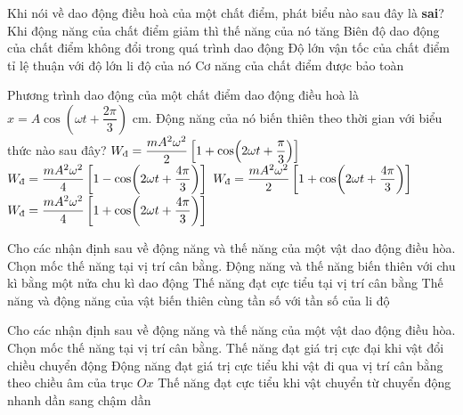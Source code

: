 \begin{ex}%
Khi nói về dao động điều hoà của một chất điểm, phát biểu nào sau đây là \textbf{sai}?
\choice
{Khi động năng của chất điểm giảm thì thế năng của nó tăng}
{Biên độ dao động của chất điểm không đổi trong quá trình dao động}
{\True Độ lớn vận tốc của chất điểm tỉ lệ thuận với độ lớn li độ của nó}
{Cơ năng của chất điểm được bảo toàn}
\end{ex} 
\begin{ex}
Phương trình dao động của một chất điểm dao động điều hoà là $x=A\cos(\omega t+\dfrac{2\pi}{3})$ cm. Động năng của nó biến thiên theo thời gian với biểu thức nào sau đây?
\choice
{$W_{\text{đ}}=\dfrac{mA^2\omega^2}{2}\left[1+\cos(2\omega t+\dfrac{\pi}{3})\right]$}
{$W_{\text{đ}}=\dfrac{mA^2\omega^2}{4}\left[1-\cos(2\omega t+\dfrac{4\pi}{3})\right]$}
{$W_{\text{đ}}=\dfrac{mA^2\omega^2}{2}\left[1+\cos(2\omega t+\dfrac{4\pi}{3})\right]$}
{\True $W_{\text{đ}}=\dfrac{mA^2\omega^2}{4}\left[1+\cos(2\omega t+\dfrac{4\pi}{3})\right]$}
\end{ex} 
\setcounter{ex}{0}
\PhanII
\begin{ex}
Cho các nhận định sau về động năng và thế năng của một vật dao động điều hòa. Chọn mốc thế năng tại vị trí cân bằng.
{\True Động năng và thế năng biến thiên với chu kì bằng một nửa chu kì dao động}
{\True Thế năng đạt cực tiểu tại vị trí cân bằng}
{Thế năng và động năng của vật biến thiên cùng tần số với tần số của li độ}
\loigiai{
\begin{itemchoice}
\itemch
\itemch
\itemch
\itemch
\end{itemchoice}

}
\end{ex} 

\begin{ex}
Cho các nhận định sau về động năng và thế năng của một vật dao động điều hòa. Chọn mốc thế năng tại vị trí cân bằng.
{\True Thế năng đạt giá trị cực đại khi vật đổi chiều chuyển động}
{Động năng đạt giá trị cực tiểu khi vật đi qua vị trí cân bằng theo chiều âm của trục $O x$}
{\True Thế năng đạt cực tiểu khi vật chuyển từ chuyển động nhanh dần sang chậm dần}
\loigiai{
\begin{itemchoice}
\itemch
\itemch
\itemch
\itemch
\end{itemchoice}

}
\end{ex} 


